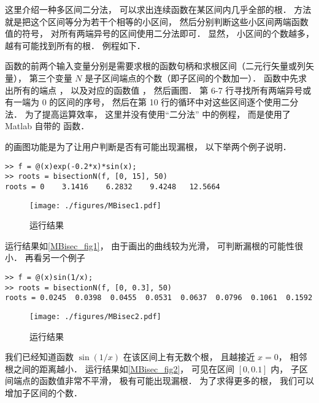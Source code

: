 

这里介绍一种多区间二分法， 可以求出连续函数在某区间内几乎全部的根． 方法就是把这个区间等分为若干个相等的小区间， 然后分别判断这些小区间两端函数值的符号， 对所有两端异号的区间使用二分法即可． 显然， 小区间的个数越多， 越有可能找到所有的根． 例程如下．


函数的前两个输入变量分别是需要求根的函数句柄和求根区间（二元行矢量或列矢量）， 第三个变量 $N$ 是子区间端点的个数（即子区间的个数加一）． 函数中先求出所有的端点 ， 以及对应的函数值 ， 然后画图． 第 6-7 行寻找所有两端异号或有一端为 0 的区间的序号， 然后在第 10 行的循环中对这些区间逐个使用二分法． 为了提高运算效率， 这里并没有使用“二分法” 中的例程， 而是使用了 Matlab 自带的  函数．

 的画图功能是为了让用户判断是否有可能出现漏根， 以下举两个例子说明．
\begin{lstlisting}[language=MatlabCom]
>> f = @(x)exp(-0.2*x)*sin(x);
>> roots = bisectionN(f, [0, 15], 50)
roots = 0    3.1416    6.2832    9.4248   12.5664
\end{lstlisting}
\begin{figure}[ht]
\centering
\texttt{[image: ./figures/MBisec1.pdf]}
\caption{运行结果} \label{MBisec_fig1}
\end{figure}
运行结果如\autoref{MBisec_fig1}， 由于画出的曲线较为光滑， 可判断漏根的可能性很小． 再看另一个例子
\begin{lstlisting}[language=MatlabCom]
>> f = @(x)sin(1/x);
>> roots = bisectionN(f, [0, 0.3], 50)
roots = 0.0245  0.0398  0.0455  0.0531  0.0637  0.0796  0.1061  0.1592
\end{lstlisting}
\begin{figure}[ht]
\centering
\texttt{[image: ./figures/MBisec2.pdf]}
\caption{运行结果} \label{MBisec_fig2}
\end{figure}
我们已经知道函数 $\sin(1/x)$ 在该区间上有无数个根， 且越接近 $x = 0$， 相邻根之间的距离越小． 运行结果如\autoref{MBisec_fig2}，  可见在区间 $[0, 0.1]$ 内， 子区间端点的函数值非常不平滑， 极有可能出现漏根． 为了求得更多的根， 我们可以增加子区间的个数．
